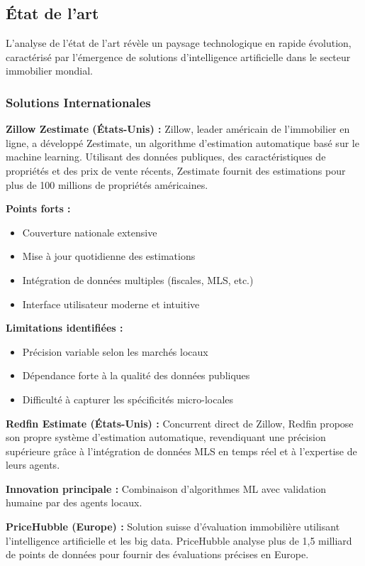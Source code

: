 \subsection{État de l'art}

L'analyse de l'état de l'art révèle un paysage technologique en rapide évolution, caractérisé par l'émergence de solutions d'intelligence artificielle dans le secteur immobilier mondial.

\subsubsection{Solutions Internationales}

\textbf{Zillow Zestimate (États-Unis) :}
Zillow, leader américain de l'immobilier en ligne, a développé Zestimate, un algorithme d'estimation automatique basé sur le machine learning. Utilisant des données publiques, des caractéristiques de propriétés et des prix de vente récents, Zestimate fournit des estimations pour plus de 100 millions de propriétés américaines.

\textbf{Points forts :}
\begin{itemize}
    \item Couverture nationale extensive
    \item Mise à jour quotidienne des estimations
    \item Intégration de données multiples (fiscales, MLS, etc.)
    \item Interface utilisateur moderne et intuitive
\end{itemize}

\textbf{Limitations identifiées :}
\begin{itemize}
    \item Précision variable selon les marchés locaux
    \item Dépendance forte à la qualité des données publiques
    \item Difficulté à capturer les spécificités micro-locales
\end{itemize}

\textbf{Redfin Estimate (États-Unis) :}
Concurrent direct de Zillow, Redfin propose son propre système d'estimation automatique, revendiquant une précision supérieure grâce à l'intégration de données MLS en temps réel et à l'expertise de leurs agents.

\textbf{Innovation principale :} Combinaison d'algorithmes ML avec validation humaine par des agents locaux.

\textbf{PriceHubble (Europe) :}
Solution suisse d'évaluation immobilière utilisant l'intelligence artificielle et les big data. PriceHubble analyse plus de 1,5 milliard de points de données pour fournir des évaluations précises en Europe.

